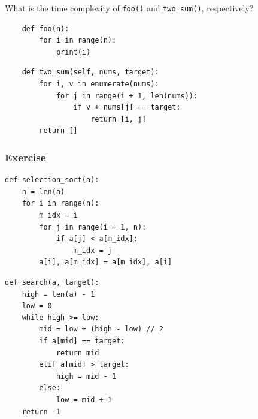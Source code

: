 \documentclass[aspectratio=169, 14pt]{beamer}
\begin{document}
\begin{frame}[fragile]
    
    {\large {}} What is the time complexity of \texttt{foo()} and \texttt{two\_sum()}, respectively? 
    \begin{verbatim}
    def foo(n):
        for i in range(n):
            print(i)
    \end{verbatim}

    \begin{verbatim}
    def two_sum(self, nums, target):
        for i, v in enumerate(nums):
            for j in range(i + 1, len(nums)):
                if v + nums[j] == target:
                    return [i, j]
        return []
    \end{verbatim}
\end{frame}

\begin{frame}[fragile]
    \frametitle{Exercise}
\begin{verbatim}
def selection_sort(a):
    n = len(a)
    for i in range(n):
        m_idx = i
        for j in range(i + 1, n):
            if a[j] < a[m_idx]:
                m_idx = j
        a[i], a[m_idx] = a[m_idx], a[i]    
\end{verbatim}
\end{frame}

\begin{frame}[fragile]
\begin{verbatim}
def search(a, target):
    high = len(a) - 1
    low = 0
    while high >= low:
        mid = low + (high - low) // 2
        if a[mid] == target:
            return mid
        elif a[mid] > target:
            high = mid - 1
        else:
            low = mid + 1
    return -1  
\end{verbatim}    

\end{frame}
\end{document}
